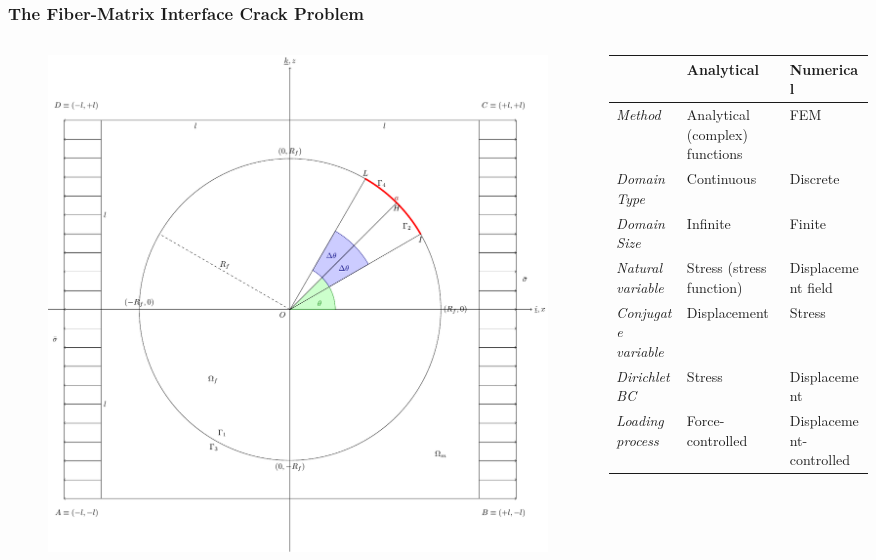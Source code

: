 \documentclass[first,firstsupp,lastsupp,last,hyperref,table]{ETHclass}
\begin{document}
\begin{frame}
\frametitle{\small The Fiber-Matrix Interface Crack Problem}
\vspace{-0.5cm}
\centering
\begin{columns}
\begin{column}{0.4\textwidth}
\begin{figure}
\includegraphics[width=\columnwidth]{fiberMatrixInterfaceProblem.pdf}
  \label{fig:jintegral}
\end{figure}
\end{column}
\begin{column}{0.6\textwidth}
\footnotesize
\begin{table}
\begin{tabularx}{\columnwidth}{XXX}
&{\tiny \bf{Analytical}}&{\tiny \bf{Numerical}}\\
\midrule
{\tiny \textit{Method}}&{\tiny Analytical (complex) functions}&{\tiny FEM}\\
\midrule
{\tiny \textit{Domain Type}}&{\tiny Continuous}&{\tiny Discrete}\\
{\tiny \textit{Domain Size}}&{\tiny Infinite}&{\tiny Finite}\\
\midrule
{\tiny \textit{Natural variable}}&{\tiny Stress (stress function)}&{\tiny Displacement field}\\
{\tiny \textit{Conjugate variable}}&{\tiny Displacement}&{\tiny Stress}\\
\midrule
{\tiny \textit{Dirichlet BC}}&{\tiny Stress}&{\tiny Displacement}\\
{\tiny \textit{Loading process}}&{\tiny Force-controlled}&{\tiny Displacement-controlled}\\
\end{tabularx}
\end{table}
\end{column}
\end{columns}
\end{frame}
\end{document}
